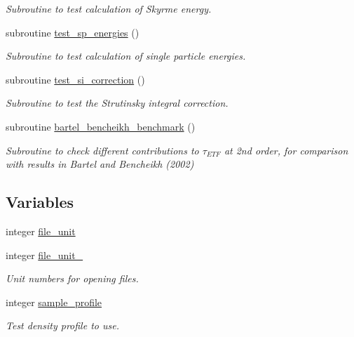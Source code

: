 \begin{DoxyCompactItemize}
\begin{DoxyCompactList}\small\item\em Subroutine to test calculation of Skyrme energy. \end{DoxyCompactList}\item 
subroutine \mbox{\hyperlink{namespacetest_abeb5e336395994821e96838b809e4140}{test\+\_\+sp\+\_\+energies}} ()
\begin{DoxyCompactList}\small\item\em Subroutine to test calculation of single particle energies. \end{DoxyCompactList}\item 
subroutine \mbox{\hyperlink{namespacetest_afde013e321ba30ada173fc343ca1fa6d}{test\+\_\+si\+\_\+correction}} ()
\begin{DoxyCompactList}\small\item\em Subroutine to test the Strutinsky integral correction. \end{DoxyCompactList}\item 
subroutine \mbox{\hyperlink{namespacetest_a8eb520f312c2647e714f169e9d5b8421}{bartel\+\_\+bencheikh\+\_\+benchmark}} ()
\begin{DoxyCompactList}\small\item\em Subroutine to check different contributions to $\tau_{ETF}$ at 2nd order, for comparison with results in Bartel and Bencheikh (2002) \end{DoxyCompactList}\end{DoxyCompactItemize}
\subsection*{Variables}
\begin{DoxyCompactItemize}
\item 
integer \mbox{\hyperlink{namespacetest_a91c93b5bfe044cfbaabf6b3acfe3be00}{file\+\_\+unit}}
\item 
integer \mbox{\hyperlink{namespacetest_aed47eec898fde16ebc3dae8f3c61abef}{file\+\_\+unit\+\_}}
\begin{DoxyCompactList}\small\item\em Unit numbers for opening files. \end{DoxyCompactList}\item 
integer \mbox{\hyperlink{namespacetest_ab8cdf368336f888e9382efe275ce4d16}{sample\+\_\+profile}}
\begin{DoxyCompactList}\small\item\em Test density profile to use. \end{DoxyCompactList}\end{DoxyCompactItemize}


